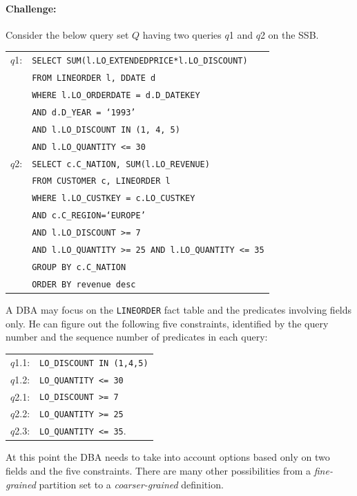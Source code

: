 \documentclass[runningheads]{comsis2}
\begin{document}
\paragraph{Challenge:}
Consider the below query set $Q$ having two queries $q$1 and $q$2 on the SSB.
\vspace{-.05in}
\begin{center}
{\small
\begin{tabular}{rl}
$q$1:	& {\tt SELECT SUM(l.LO$\_$EXTENDEDPRICE*l.LO\_DISCOUNT)} \\ 
		& {\tt FROM LINEORDER l, DDATE d} \\
		& {\tt WHERE l.LO\_ORDERDATE = d.D\_DATEKEY} \\
		& {\tt AND d.D\_YEAR = `1993'} \\
		& {\tt AND l.LO\_DISCOUNT IN (1, 4, 5)} \\
        & {\tt AND l.LO\_QUANTITY <= 30} \\ 
$q$2:	& {\tt SELECT c.C\_NATION, SUM(l.LO\_REVENUE)} \\ 
		& {\tt FROM CUSTOMER c, LINEORDER l} \\
		& {\tt WHERE l.LO\_CUSTKEY = c.LO\_CUSTKEY} \\
		& {\tt AND c.C\_REGION=`EUROPE'} \\
		& {\tt AND l.LO\_DISCOUNT >= 7} \\
		& {\tt AND l.LO\_QUANTITY >= 25 AND l.LO\_QUANTITY <= 35} \\
		& {\tt GROUP BY c.C\_NATION} \\
		& {\tt ORDER BY revenue desc} \\
\end{tabular}
}
\vspace{-.01in}
\end{center}

A DBA may focus on the {\tt LINEORDER} fact table and 
the predicates involving  fields only. 
He can figure out the following five constraints, identified by the query number 
and the sequence number of predicates in each query: 
\vspace{-.05in}
\begin{center}
\begin{tabular}{cl}
$q$1.1: & {\tt LO\_DISCOUNT IN (1,4,5)} \\ 
$q$1.2: & {\tt LO\_QUANTITY <= 30} \\ 
$q$2.1: & {\tt LO\_DISCOUNT >= 7} \\ 
$q$2.2: & {\tt LO\_QUANTITY >= 25}\\ 
$q$2.3: & {\tt LO\_QUANTITY <= 35}. \\ 
\end{tabular}
\end{center}
\vspace{-.05in}
At this point the DBA needs to take into account options 
based only on two fields and the five constraints. 
There are many other possibilities from a {\em fine-grained} partition set 
to a {\em coarser-grained} definition. 
\end{document}
